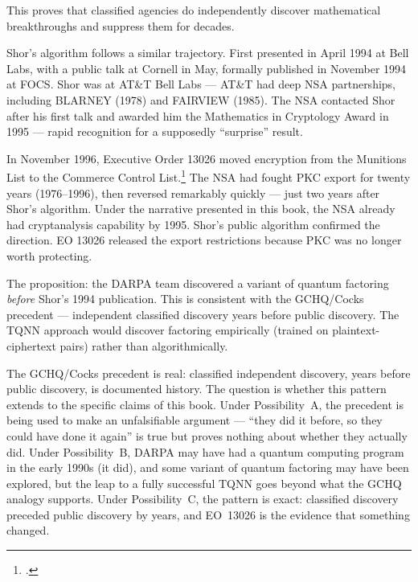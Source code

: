This proves that classified agencies do independently discover mathematical breakthroughs and suppress them for decades.

Shor's algorithm follows a similar trajectory. First presented in April 1994 at Bell Labs, with a public talk at Cornell in May, formally published in November 1994 at FOCS. Shor was at AT\&T Bell Labs --- AT\&T had deep NSA partnerships, including BLARNEY (1978) and FAIRVIEW (1985). The NSA contacted Shor after his first talk and awarded him the Mathematics in Cryptology Award in 1995 --- rapid recognition for a supposedly ``surprise'' result.

In November 1996, Executive Order 13026 moved encryption from the Munitions List to the Commerce Control List.\footcite{eo13026} The NSA had fought PKC export for twenty years (1976--1996), then reversed remarkably quickly --- just two years after Shor's algorithm. Under the narrative presented in this book, the NSA already had  cryptanalysis capability by 1995. Shor's public algorithm confirmed the direction. EO 13026 released the export restrictions because PKC was no longer worth protecting.

The proposition: the DARPA team discovered a variant of quantum factoring \textit{before} Shor's 1994 publication. This is consistent with the GCHQ/Cocks precedent --- independent classified discovery years before public discovery. The TQNN approach would discover factoring empirically (trained on plaintext-ciphertext pairs) rather than algorithmically.%

The GCHQ/Cocks precedent is real: classified independent discovery, years before public discovery, is documented history. The question is whether this pattern extends to the specific claims of this book. Under Possibility~A, the precedent is being used to make an unfalsifiable argument --- ``they did it before, so they could have done it again'' is true but proves nothing about whether they actually did. Under Possibility~B, DARPA may have had a quantum computing program in the early 1990s (it did), and some variant of quantum factoring may have been explored, but the leap to a fully successful TQNN goes beyond what the GCHQ analogy supports. Under Possibility~C, the pattern is exact: classified discovery preceded public discovery by years, and EO~13026 is the evidence that something changed.

\chapterreturn
